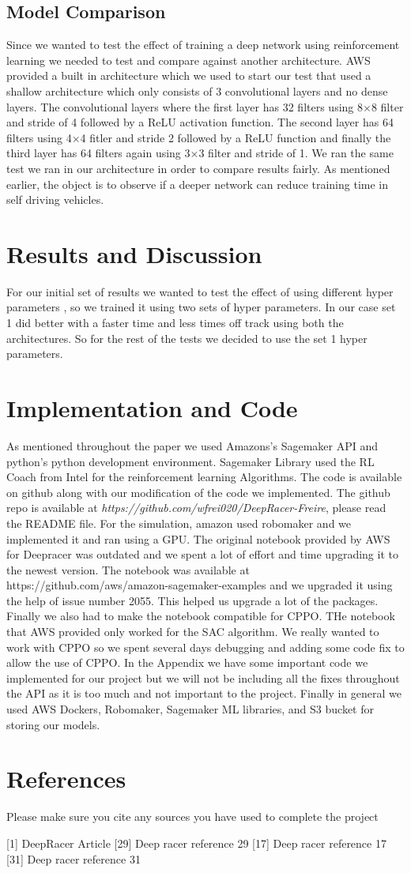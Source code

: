 \documentclass[journal]{IEEEtran}
\begin{document}
\subsection{Model Comparison}
Since we wanted to test the effect of training a deep network using reinforcement learning we needed to test and compare against another architecture.  AWS provided a built in architecture which we used to start our test that used a shallow architecture which only consists of 3 convolutional layers and no dense layers. The convolutional layers where the first layer has 32 filters using 8$\times$8 filter and stride of 4 followed by a ReLU activation function.  The second layer has 64 filters using 4$\times$4 fitler and stride 2 followed by a ReLU function and finally the third layer has 64 filters again using 3$\times$3 filter and stride of 1.  We ran the same test we ran in our architecture in order to compare results fairly.  As mentioned earlier, the object is to observe if a deeper network can reduce training time in self driving vehicles.

\section{Results and Discussion}
For our initial set of results we wanted to test the effect of using different hyper parameters , so we trained it using two sets of hyper parameters.  In our case set 1 did better with a faster time and less times off track using both the architectures.  So for the rest of the tests we decided to use the set 1 hyper parameters.

\section{Implementation and Code}
As mentioned throughout the paper we used Amazons’s Sagemaker API and python’s python development environment.  Sagemaker Library used the RL Coach from Intel for the reinforcement learning Algorithms.  The code is available on github along with our modification of the code we implemented.  The github repo is available at \emph{https://github.com/wfrei020/DeepRacer-Freire}, please read the README file.  For the simulation, amazon used robomaker and we implemented it and ran using a GPU.  The original notebook provided by AWS for Deepracer was outdated and we spent a lot of effort and time upgrading it to the newest version.  The notebook was available at https://github.com/aws/amazon-sagemaker-examples and we upgraded it using the help of issue number 2055.  This helped us upgrade a lot of the packages.  Finally we also had to make the notebook compatible for CPPO.  THe notebook that AWS provided only worked for the SAC algorithm.  We really wanted to work with CPPO so we spent several days debugging and adding some code fix to allow the use of CPPO.  In the Appendix we have some important code we implemented for our project but we will not be including all the fixes throughout the API as it is too much and not important to the project. Finally in general we used AWS Dockers, Robomaker, Sagemaker ML libraries, and S3 bucket for storing our models. 

\section{References}
Please make sure you cite any sources you have used to complete the project

[1] DeepRacer Article
[29] Deep racer reference 29
[17] Deep racer reference 17
[31] Deep racer reference 31
\end{document}
